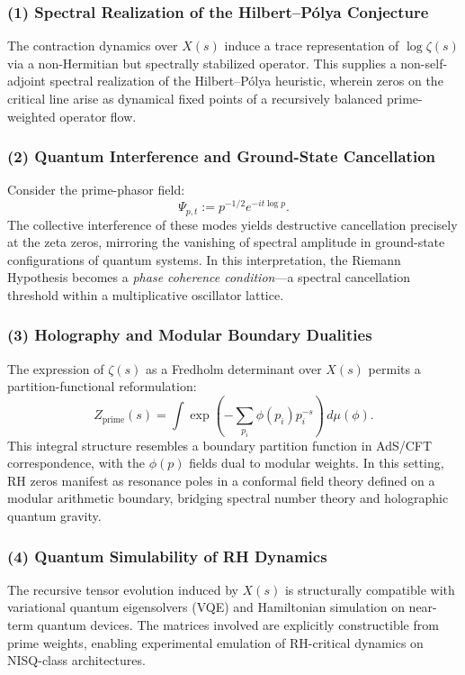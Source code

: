 \documentclass[12pt]{article}
\begin{document}
\subsubsection*{(1) Spectral Realization of the Hilbert--Pólya Conjecture}

The contraction dynamics over $X(s)$ induce a trace representation of $\log \zeta(s)$ via a non-Hermitian but spectrally stabilized operator. This supplies a non-self-adjoint spectral realization of the Hilbert--Pólya heuristic, wherein zeros on the critical line arise as dynamical fixed points of a recursively balanced prime-weighted operator flow.

\subsubsection*{(2) Quantum Interference and Ground-State Cancellation}

Consider the prime-phasor field:
\[
\Psi_{p,t} := p^{-1/2} e^{-i t \log p}.
\]
The collective interference of these modes yields destructive cancellation precisely at the zeta zeros, mirroring the vanishing of spectral amplitude in ground-state configurations of quantum systems. In this interpretation, the Riemann Hypothesis becomes a \emph{phase coherence condition}—a spectral cancellation threshold within a multiplicative oscillator lattice.

\subsubsection*{(3) Holography and Modular Boundary Dualities}

The expression of $\zeta(s)$ as a Fredholm determinant over $X(s)$ permits a partition-functional reformulation:
\[
Z_{\mathrm{prime}}(s) = \int \exp\left( -\sum_{p_i} \phi(p_i) p_i^{-s} \right) \, d\mu(\phi).
\]
This integral structure resembles a boundary partition function in AdS/CFT correspondence, with the $\phi(p)$ fields dual to modular weights. In this setting, RH zeros manifest as resonance poles in a conformal field theory defined on a modular arithmetic boundary, bridging spectral number theory and holographic quantum gravity.

\subsubsection*{(4) Quantum Simulability of RH Dynamics}

The recursive tensor evolution induced by $X(s)$ is structurally compatible with variational quantum eigensolvers (VQE) and Hamiltonian simulation on near-term quantum devices. The matrices involved are explicitly constructible from prime weights, enabling experimental emulation of RH-critical dynamics on NISQ-class architectures.
\end{document}

